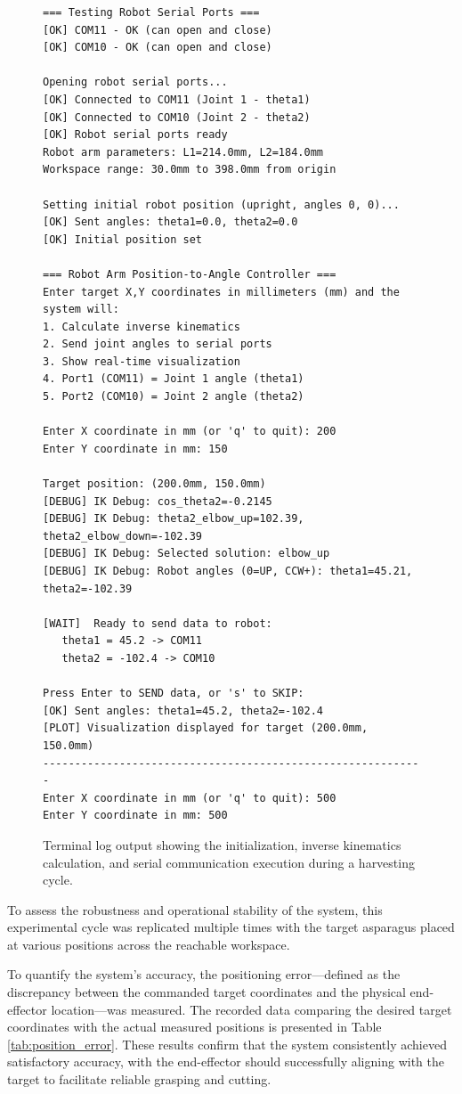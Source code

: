 \begin{figure}[H]
    \centering
    \small
    \begin{verbatim}
=== Testing Robot Serial Ports ===
[OK] COM11 - OK (can open and close)
[OK] COM10 - OK (can open and close)

Opening robot serial ports...
[OK] Connected to COM11 (Joint 1 - theta1)
[OK] Connected to COM10 (Joint 2 - theta2)
[OK] Robot serial ports ready
Robot arm parameters: L1=214.0mm, L2=184.0mm
Workspace range: 30.0mm to 398.0mm from origin

Setting initial robot position (upright, angles 0, 0)...
[OK] Sent angles: theta1=0.0, theta2=0.0
[OK] Initial position set

=== Robot Arm Position-to-Angle Controller ===
Enter target X,Y coordinates in millimeters (mm) and the system will:
1. Calculate inverse kinematics
2. Send joint angles to serial ports
3. Show real-time visualization
4. Port1 (COM11) = Joint 1 angle (theta1)
5. Port2 (COM10) = Joint 2 angle (theta2)

Enter X coordinate in mm (or 'q' to quit): 200
Enter Y coordinate in mm: 150

Target position: (200.0mm, 150.0mm)
[DEBUG] IK Debug: cos_theta2=-0.2145
[DEBUG] IK Debug: theta2_elbow_up=102.39, theta2_elbow_down=-102.39
[DEBUG] IK Debug: Selected solution: elbow_up
[DEBUG] IK Debug: Robot angles (0=UP, CCW+): theta1=45.21, theta2=-102.39

[WAIT]  Ready to send data to robot:
   theta1 = 45.2 -> COM11
   theta2 = -102.4 -> COM10

Press Enter to SEND data, or 's' to SKIP: 
[OK] Sent angles: theta1=45.2, theta2=-102.4
[PLOT] Visualization displayed for target (200.0mm, 150.0mm)
------------------------------------------------------------
Enter X coordinate in mm (or 'q' to quit): 500
Enter Y coordinate in mm: 500
    \end{verbatim}
    \caption{Terminal log output showing the initialization, inverse kinematics calculation, and serial communication execution during a harvesting cycle.}
    \label{fig:terminal_log}
\end{figure}




To assess the robustness and operational stability of the system, this experimental cycle was replicated 
multiple times with the target asparagus placed at various positions across the reachable workspace.

To quantify the system's accuracy, the positioning error---defined as the discrepancy between the commanded 
target coordinates and the physical end-effector location---was measured. The recorded data comparing the 
desired target coordinates with the actual measured positions is presented in Table \ref{tab:position_error}. 
These results confirm that the system consistently achieved satisfactory accuracy, with the end-effector should  
successfully aligning with the target to facilitate reliable grasping and cutting.

